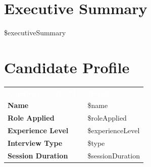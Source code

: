 \documentclass[11pt,a4paper]{article}
\begin{document}
\newpage
{}
\setcounter{page}{1}

\section{Executive Summary}
\${executiveSummary}

\section{Candidate Profile}
\renewcommand{\arraystretch}{1.5}
\begin{tabularx}{\textwidth}{@{} >{\bfseries\color{WiseNavy}}p{4.5cm} X @{}}
  \rowcolor{WiseThemeBg}
  \textcolor{white}{\textbf{Candidate Attribute}} & \textcolor{white}{\textbf{Details}} \\
  \rowcolor{WiseLight}
  Name & \${name} \\
  Role Applied & \${roleApplied} \\
  \rowcolor{WiseLight}
  Experience Level & \${experienceLevel} \\
  Interview Type & \${type} \\
  \rowcolor{WiseLight}
  Session Duration & \${sessionDuration} \\
  \bottomrule
\end{tabularx}
\renewcommand{\arraystretch}{1}

\end{document}
